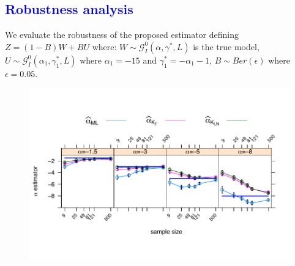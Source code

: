 \documentclass[a0,portrait]{a0poster}
\begin{document}
\begin{multicols}{3}
\vspace{0.8cm}
 
\section*{\textcolor{blue}{Robustness analysis}}
\label{robustez}
We  evaluate the robustness of the proposed estimator defining $Z=(1-B)W+BU$ where: $W \sim \mathcal{G}_I^0(\alpha,\gamma^*,L)$ is the true model, $U \sim \mathcal{G}_I^0(\alpha_1,\gamma_1^*,L)$ where $\alpha_1=-15$ and $\gamma_1^*=-\alpha_1-1$, $B \sim Ber(\epsilon)$ where $\epsilon=0.05$. 
\begin{center}
	\begin{minipage}[t]{0.96\linewidth}
		\begin{figure}
		\includegraphics[scale=1.1]{../../../../Figures/IVJIAAIS2017/Cont/alfa500_sinmenos20_CONTMVconX0yGAyLN_OPTIM_hasta500_MOM1_2_SinCte_Ver2FINALbarrasdeerror_L3.pdf}\\
		\end{figure}
	\end{minipage}
\end{center}


\end{multicols}
\end{document}
